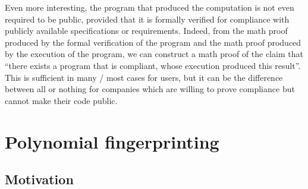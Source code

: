 \documentclass{article}
\theoremstyle{plain}
\theoremstyle{definition}
\begin{document}
Even more interesting, the program that produced the computation is not even required to be public, provided that it is formally verified for compliance with publicly available specifications or requirements.  Indeed, from the math proof produced by the formal verification of the program and the math proof produced by the execution of the program, we can construct a math proof of the claim that ``there exists a program that is compliant, whose execution produced this result''.  This is sufficient in many / most cases for users, but it can be the difference between all or nothing for companies which are willing to prove compliance but cannot make their code public. 
























































\section{Polynomial fingerprinting} 
\label{sec:polynomial-fingerprinting}

\subsection{Motivation} 
\label{pf:motivation}
\end{document}
